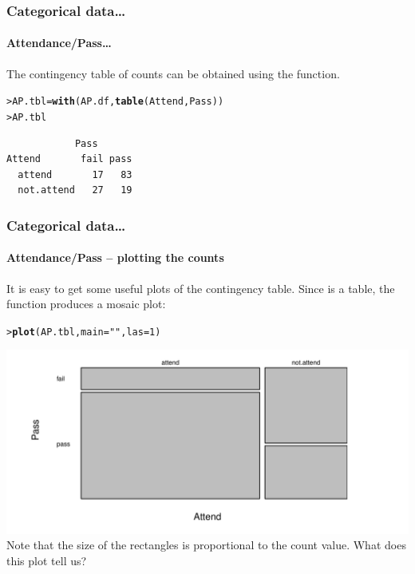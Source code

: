 \documentclass{beamer}\usepackage[]{graphicx}\usepackage[]{xcolor}
\makeatletter
\def\maxwidth{ %
  \ifdim\Gin@nat@width>\linewidth
    \linewidth
  \else
    \Gin@nat@width
  \fi
}
\newcommand{\hlnum}[1]{\textcolor[rgb]{0.686,0.059,0.569}{#1}}%
\newcommand{\hlstr}[1]{\textcolor[rgb]{0.192,0.494,0.8}{#1}}%
\newcommand{\hlstd}[1]{\textcolor[rgb]{0.345,0.345,0.345}{#1}}%
\newcommand{\hlkwb}[1]{\textcolor[rgb]{0.69,0.353,0.396}{#1}}%
\newcommand{\hlkwc}[1]{\textcolor[rgb]{0.333,0.667,0.333}{#1}}%
\newcommand{\hlkwd}[1]{\textcolor[rgb]{0.737,0.353,0.396}{\textbf{#1}}}%
\newenvironment{kframe}{%
 \def\at@end@of@kframe{}%
 \ifinner\ifhmode%
  \def\at@end@of@kframe{\end{minipage}}%
  \begin{minipage}{\columnwidth}%
 \fi\fi%
 \def\FrameCommand##1{\hskip\@totalleftmargin \hskip-\fboxsep
 \colorbox{shadecolor}{##1}\hskip-\fboxsep
     \hskip-\linewidth \hskip-\@totalleftmargin \hskip\columnwidth}%
 \MakeFramed {\advance\hsize-\width
   \@totalleftmargin\z@ \linewidth\hsize
   \@setminipage}}%
 {\par\unskip\endMakeFramed%
 \at@end@of@kframe}
\newenvironment{knitrout}{}{} %
\makeatother
\begin{document}
\begin{frame}[fragile]
\frametitle{Categorical data\ldots}
\framesubtitle{Attendance/Pass\ldots}
The contingency table of counts can be obtained using the  function.
\bigskip

\begin{knitrout}\scriptsize
{}\color{fgcolor}\begin{kframe}
\begin{alltt}
\hlstd{> }\hlstd{AP.tbl}\hlkwb{=}\hlkwd{with}\hlstd{(AP.df,}\hlkwd{table}\hlstd{(Attend,Pass))}
\hlstd{> }\hlstd{AP.tbl}
\end{alltt}
\begin{verbatim}
            Pass
Attend       fail pass
  attend       17   83
  not.attend   27   19
\end{verbatim}
\end{kframe}
\end{knitrout}
\end{frame}



\begin{frame}[fragile]
\frametitle{Categorical data\ldots}
\framesubtitle{Attendance/Pass -- plotting the counts}
It is easy to get some useful plots of the contingency table. Since  is a table, the  function produces a mosaic plot:
\begin{knitrout}\scriptsize
{}\color{fgcolor}\begin{kframe}
\begin{alltt}
\hlstd{> }\hlkwd{plot}\hlstd{(AP.tbl,}\hlkwc{main}\hlstd{=}\hlstr{""}\hlstd{,}\hlkwc{las}\hlstd{=}\hlnum{1}\hlstd{)}
\end{alltt}
\end{kframe}
\includegraphics[width=\maxwidth]{figure/RC-H16-002b-1} 
\end{knitrout}
Note that the size of the rectangles is proportional to the count value. What does this plot tell us?
\end{frame}
\end{document}
